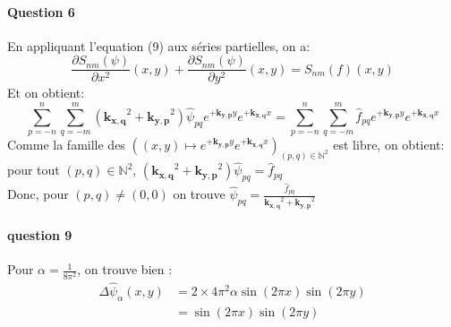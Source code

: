 \documentclass{article}
\newcommand{\pd}[2]{\dfrac{\partial#1}{\partial#2}}
\newcommand{\complex}[1]{\bm{#1}}
\newcommand{\kxq}{\complex{k_{x,q}}}
\newcommand{\kyp}{\complex{k_{y,p}}}
\begin{document}
\paragraph{Question 6}
En appliquant l'equation (9) aux séries partielles, on a:
\begin{equation}
	\pd{S_{nm}(\psi)}{x^2}(x,y)
    + 
	\pd{S_{nm}(\psi)}{y^2}(x,y)
	= S_{nm}(f)(x,y)
    \label{eq:poisson}
\end{equation}
Et on obtient:
\begin{equation*}
    \sum_{p=-n}^{n} \sum_{q=-m}^{m} (\kxq^2 + \kyp^2) \hat{\psi}_{pq} e^{+\kyp y} e^{+\kxq x}
	=
		\sum_{p=-n}^{n} \sum_{q=-m}^{m}\hat{f}_{pq} e^{+\kyp y} e^{+\kxq x}
\end{equation*}
Comme la famille des \(((x, y)\mapsto e^{+\kyp y} e^{+\kxq x})_{(p,q)\in\mathbb N^2}\)
est libre, on obtient: pour tout \((p,q)\in\mathbb N^2\), \((\kxq^2 + \kyp^2) \hat{\psi}_{pq} = \hat{f}_{pq}\)
\\
Donc, pour \((p,q)\neq(0,0)\) on trouve \(\hat{\psi}_{pq} = \frac{\hat{f}_{pq}}{\kxq^2 + \kyp^2}\)

\paragraph{question 9}
Pour \(\alpha = \frac{1}{8\pi^2}\), on trouve bien :
\begin{align*}
	\Delta \hat{\psi}_{\alpha}(x,y) & = 2\times4\pi^2\alpha\sin(2\pi x)\sin(2\pi y)\\
	& = \sin(2\pi x)\sin(2\pi y)
\end{align*}
\end{document}
